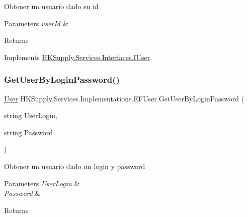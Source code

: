 Obtener un usuario dado su id 


\begin{DoxyParams}{Parameters}
{\em user\+Id} & \\
\hline
\end{DoxyParams}
\begin{DoxyReturn}{Returns}

\end{DoxyReturn}


Implements \mbox{\hyperlink{interface_h_k_supply_1_1_services_1_1_interfaces_1_1_i_user}{H\+K\+Supply.\+Services.\+Interfaces.\+I\+User}}.

\mbox{\label{class_h_k_supply_1_1_services_1_1_implementations_1_1_e_f_user_a69f04e0ab5ba947fc315c60abc7cdbf1}} 
\subsubsection{\texorpdfstring{Get\+User\+By\+Login\+Password()}{GetUserByLoginPassword()}}
{\footnotesize\ttfamily \mbox{\hyperlink{class_h_k_supply_1_1_models_1_1_user}{User}} H\+K\+Supply.\+Services.\+Implementations.\+E\+F\+User.\+Get\+User\+By\+Login\+Password (\begin{DoxyParamCaption}\item[{string}]{User\+Login,  }\item[{string}]{Password }\end{DoxyParamCaption})}



Obtener un usuario dado un login y password 


\begin{DoxyParams}{Parameters}
{\em User\+Login} & \\
\hline
{\em Password} & \\
\hline
\end{DoxyParams}
\begin{DoxyReturn}{Returns}

\end{DoxyReturn}


